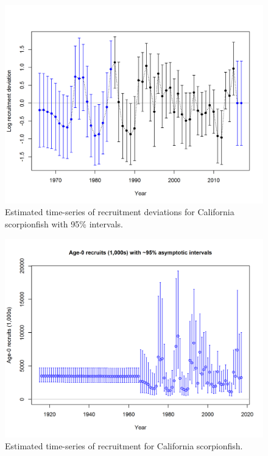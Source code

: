 \documentclass[12pt,]{article}
\begin{document}
\FloatBarrier

\begin{figure}[htbp]
\centering
\includegraphics{r4ss/plots_mod1/recdevs2_withbars.png}
\caption{Estimated time-series of recruitment deviations for California
scorpionfish with 95\% intervals. \label{fig:recdevs2_withbars}}
\end{figure}

\begin{figure}[htbp]
\centering
\includegraphics{r4ss/plots_mod1/ts11_Age-0_recruits_(1000s)_with_95_asymptotic_intervals.png}
\caption{Estimated time-series of recruitment for California
scorpionfish.
\label{fig:ts11_Age-0_recruits_(1000s)_with_95_asymptotic_intervals}}
\end{figure}
\end{document}
